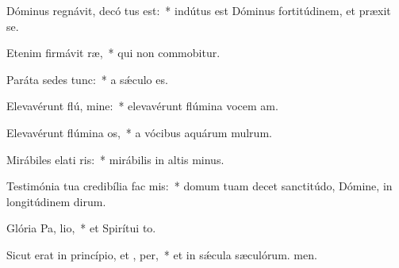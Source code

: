 \item Dóminus regnávit, decó tus est:~* indútus est Dóminus fortitúdinem, et præxit se.
\item Etenim firmávit  ræ,~* qui non commobitur.
\item Paráta sedes   tunc:~* a sǽculo  es.
\item Elevavérunt flú, mine:~* elevavérunt flúmina vocem am.
\item Elevavérunt flúmina  os,~* a vócibus aquárum mulrum.
\item Mirábiles elati ris:~* mirábilis in altis minus.
\item Testimónia tua credibília fac  mis:~* domum tuam decet sanctitúdo, Dómine, in longitúdinem dirum.
\item Glória Pa,  lio,~* et Spirítui to.
\item Sicut erat in princípio, et ,  per,~* et in sǽcula sæculórum. men.
